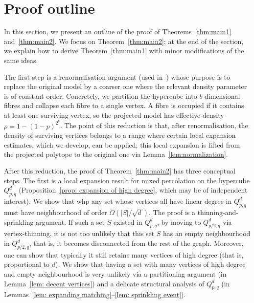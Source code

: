 \documentclass{article}
\theoremstyle{definition}
\begin{document}
\section{Proof outline}\label{sec: outline}
In this section, we present an outline of the proof of Theorems~\ref{thm:main1} and~\ref{thm:main2}. 
We focus on Theorem~\ref{thm:main2}; at the end of the section, we explain how to derive Theorem~\ref{thm:main1} with minor modifications of the same ideas.

The first step is a renormalisation argument (used in~\cite{FKSS26}) whose purpose is to replace the original model by a coarser one where the relevant density parameter is of constant order.
Concretely, we partition the hypercube into $b$-dimensional fibres and collapse each fibre to a single vertex. A fibre is occupied if it contains at least one surviving vertex, so the projected model has effective density $\rho = 1-(1-p)^{2^b}$. 
The point of this reduction is that, after renormalisation, the density of surviving vertices belongs to a range where certain local expansion estimates, which we develop, can be applied; 
this local expansion is lifted from the projected polytope to the original one via Lemma~\ref{lem:normalization}. 

After this reduction, the proof of Theorem~\ref{thm:main2} has three conceptual steps. The first is a local expansion result for mixed percolation on the hypercube $Q^d_{p,q}$ (Proposition~\ref{prop: expansion of high degree}, which may be of independent interest).
We show that whp any set whose vertices all have linear degree in $Q^d_{p,q}$ must have neighbourhood of order $\Omega(|S|/\sqrt d)$. 
The proof is a thinning-and-sprinkling argument. If such a set $S$ existed in $Q^d_{p,q}$, by moving to $Q^d_{p/2,q}$ via vertex-thinning, it is not too unlikely that this set $S$ has an empty neighbourhood in $Q^d_{p/2,q}$, that is, it becomes disconnected from the rest of the graph.
Moreover, one can show that typically it still retains many vertices of high degree (that is, proportional to $d$). 
We show that having a set with many vertices of high degree and empty neighbourhood is very unlikely via a partitioning argument (in Lemma~\ref{lem: decent vertices}) and a delicate structural analysis of $Q^d_{p,q}$ (in Lemmas~\ref{lem: expanding matching}--\ref{lem: sprinkling event}).
\end{document}
